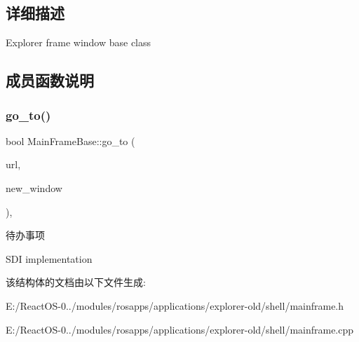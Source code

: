 \subsection{详细描述}
Explorer frame window base class 

\subsection{成员函数说明}
\mbox{\label{struct_main_frame_base_acda2cb5fd6551d867dbce53b86c1b01f}} 
\subsubsection{\texorpdfstring{go\+\_\+to()}{go\_to()}}
{\footnotesize\ttfamily bool Main\+Frame\+Base\+::go\+\_\+to (\begin{DoxyParamCaption}\item[{L\+P\+C\+T\+S\+TR}]{url,  }\item[{bool}]{new\+\_\+window }\end{DoxyParamCaption})\hspace{0.3cm}{\ttfamily [protected]}, {\ttfamily [virtual]}}

\begin{DoxyRefDesc}{待办事项}
\item[\hyperlink{todo__todo000034}{待办事项}]S\+DI implementation \end{DoxyRefDesc}


该结构体的文档由以下文件生成\+:\begin{DoxyCompactItemize}
\item 
E\+:/\+React\+O\+S-\/0../modules/rosapps/applications/explorer-\/old/shell/mainframe.\+h\item 
E\+:/\+React\+O\+S-\/0../modules/rosapps/applications/explorer-\/old/shell/mainframe.\+cpp\end{DoxyCompactItemize}
